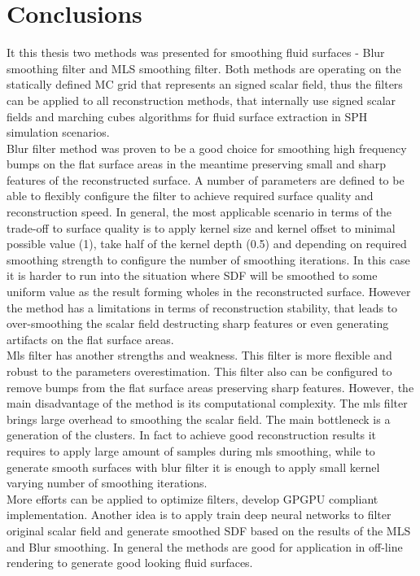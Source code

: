 \chapter{Conclusions}
It this thesis two methods was presented for smoothing fluid surfaces - Blur smoothing filter and MLS smoothing filter. Both methods are operating on the statically defined MC grid that represents an signed scalar field, thus the filters can be applied to all reconstruction methods, that internally use signed scalar fields and marching cubes algorithms for fluid surface extraction in SPH simulation scenarios.\\
Blur filter method was proven to be a good choice for smoothing high frequency bumps on the flat surface areas in the meantime preserving small and sharp features of the reconstructed surface. A number of parameters are defined to be able to flexibly configure the filter to achieve required surface quality and reconstruction speed. In general, the most applicable scenario in terms of the trade-off to surface quality is to apply kernel size and kernel offset to minimal possible value (1), take half of the kernel depth (0.5) and depending on required smoothing strength to configure the number of smoothing iterations. In this case it is harder to run into the situation where SDF will be smoothed to some uniform value as the result forming wholes in the reconstructed surface.
However the method has a limitations in terms of reconstruction stability, that leads to over-smoothing the scalar field destructing sharp features or even generating artifacts on the flat surface areas.\\
Mls filter has another strengths and weakness. This filter is more flexible and robust to the parameters overestimation. This filter also can be configured to remove bumps from the flat surface areas preserving sharp features. However, the main disadvantage of the method is its computational complexity. The mls filter brings large overhead to smoothing the scalar field. The main bottleneck is a generation of the clusters. In fact to achieve good reconstruction results it requires to apply large amount of samples during mls smoothing, while to generate smooth surfaces with blur filter it is enough to apply small kernel varying number of smoothing iterations.\\
More efforts can be applied to optimize filters, develop GPGPU compliant implementation. Another idea is to apply train deep neural networks to filter original scalar field and generate smoothed SDF based on the results of the MLS and Blur smoothing. In general the methods are good for application in off-line rendering to generate good looking fluid surfaces.
